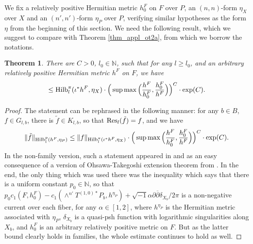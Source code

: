 \documentclass[12pt]{article}
\numberwithin{equation}{section}
\theoremstyle{theorem}
\newtheorem{thm}{Theorem}[section]
\theoremstyle{definition}
\theoremstyle{remark}
\newcommand{\imun} {\sqrt{-1}}
\newcommand{\res}{{\rm{Res}}}
\newcommand{\nat}{\mathbb{N}}
\newcommand{\dbar}{ \overline{\partial} }
\begin{document}
	\par 
	We fix a relatively positive Hermitian metric $h^F_0$ on $F$ over $P$, an $(n, n)$-form $\eta_X$ over $X$ and an $(n', n')$-form $\eta_P$ over $P$, verifying similar hypotheses as the form $\eta$ from the beginning of this section. 
	We need the following result, which we suggest to compare with Theorem \ref{thm_appl_ot2a}, from which we borrow the notations.
	\par 
	\begin{thm}\label{thm_appl_ot2a2}
		There are $C > 0$, $l_0 \in \nat$, such that for any $l \geq l_0$, and an arbitrary relatively positive Hermitian metric $h^F$ on $F$, we have 
		\begin{equation}
			[{\rm{Hilb}}_l^p(h^F, \eta_P)]
			\leq
			{\rm{Hilb}}_l^{\pi}(\iota^* h^F, \eta_X)
			\cdot
			\Big(\sup \max \Big( \frac{h^F}{h^F_0}, \frac{h^F_0}{h^F} \Big) \Big)^C
			\cdot
			\exp(C).
		\end{equation}
	\end{thm}
	\begin{proof}
		The statement can be rephrased in the following manner: for any $b \in B$, $f \in G_{l, b}$, there is $\tilde{f} \in K_{l, b}$, so that $\res_l(\tilde{f}) = f$, and we have
		\begin{equation}
			\| \tilde{f} \|_{{\rm{Hilb}}_l^p(h^F, \eta_P)}
			\leq
			\| f \|_{{\rm{Hilb}}_l^{\pi}(\iota^* h^F, \eta_X)}
			\cdot
			\Big(\sup \max \Big( \frac{h^F}{h^F_0}, \frac{h^F_0}{h^F} \Big) \Big)^C
			\cdot
			\exp(C).
		\end{equation}
		In the non-family version, such a statement appeared in \cite[Theorem 4.14]{FinTits} and \cite[Theorem 2.5]{FinSecRing} as an easy consequence of a version of Ohsawa-Takegoshi extension theorem from \cite{DemExtRed}.
		In the end, the only thing which was used there was the inequality \cite[(2.11)]{FinSecRing} which says that there is a uniform constant $p_0 \in \nat$, so that $p_0 c_1(F, h^F_0) - c_1(\wedge^{n'} T^{(1, 0)*} P_b, h^{\eta_P}) + \imun \alpha \partial \dbar \delta_{X_b} / 2 \pi$ is a non-negative current over each fiber, for any $\alpha \in [1, 2]$, where $h^{\eta_P}$ is the Hermitian metric associated with $\eta_P$, $\delta_{X_b}$ is a quasi-psh function with logarithmic singularities along $X_b$, and $h^F_0$ is an arbitrary relatively positive metric on $F$.
		But as the latter bound clearly holds in families, the whole estimate continues to hold as well.
	\end{proof}
\end{document}
